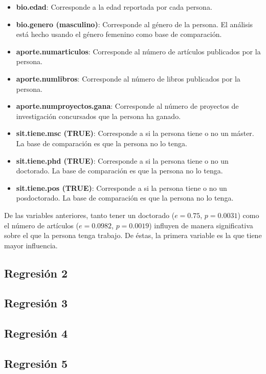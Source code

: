 \documentclass{article}
\begin{document}
\begin{itemize}
\item \textbf{bio.edad}: Corresponde a la edad reportada por cada persona.
\item \textbf{bio.genero (masculino)}: Corresponde al género de la persona. El análisis está hecho usando el género femenino como base de comparación.
\item \textbf{aporte.numarticulos}: Corresponde al número de artículos publicados por la persona.
\item \textbf{aporte.numlibros}: Corresponde al número de libros publicados por la persona.
\item \textbf{aporte.numproyectos.gana}: Corresponde al número de proyectos de investigación concursados que la persona ha ganado.
\item \textbf{sit.tiene.msc (TRUE)}: Corresponde a si la persona tiene o no un máster. La base de comparación es que la persona no lo tenga.
\item \textbf{sit.tiene.phd (TRUE)}: Corresponde a si la persona tiene o no un doctorado. La base de comparación es que la persona no lo tenga.
\item \textbf{sit.tiene.pos (TRUE)}: Corresponde a si la persona tiene o no un posdoctorado. La base de comparación es que la persona no lo tenga.
\end{itemize}

De las variables anteriores, tanto tener un doctorado ($e=0.75$, $p=0.0031$) como el número de artículos ($e=0.0982$, $p=0.0019$) influyen de manera significativa sobre el que la persona tenga trabajo. De éstas, la primera variable es la que tiene mayor influencia.

\subsection{Regresión 2}


\subsection{Regresión 3}


\subsection{Regresión 4}


\subsection{Regresión 5}

\end{document}
